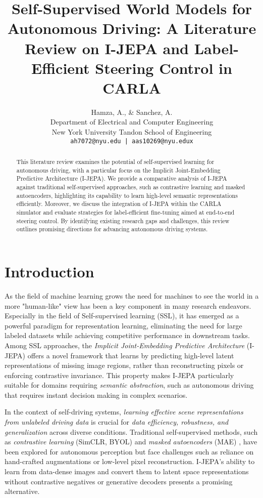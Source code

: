 \documentclass{article}
\title{Self-Supervised World Models for Autonomous Driving: A Literature Review on I-JEPA and Label-Efficient Steering Control in CARLA}
\author{
    Hamza, A., \& Sanchez, A. \\
    Department of Electrical and Computer Engineering \\
    New York University Tandon School of Engineering \\
    \texttt{ah7072@nyu.edu | aas10269@nyu.edux}
}
\begin{document}
\maketitle

\begin{abstract}
    This literature review examines the potential of self-supervised learning for autonomous driving, with a particular focus on the Implicit Joint-Embedding Predictive Architecture (I-JEPA). We provide a comparative analysis of I-JEPA against traditional self-supervised approaches, such as contrastive learning and masked autoencoders, highlighting its capability to learn high-level semantic representations efficiently. Moreover, we discuss the integration of I-JEPA within the CARLA simulator and evaluate strategies for label-efficient fine-tuning aimed at end-to-end steering control. By identifying existing research gaps and challenges, this review outlines promising directions for advancing autonomous driving systems.
\end{abstract}

\section{Introduction}

As the field of machine learning grows the need for machines to see the world in a more "human-like" view has been a key component in many research endeavors. Especially in the field of Self-supervised learning (SSL), it has emerged as a powerful paradigm for representation learning, eliminating the need for large labeled datasets while achieving competitive performance in downstream tasks. Among SSL approaches, the \textit{Implicit Joint-Embedding Predictive Architecture} (I-JEPA) \citep{assran2023self} offers a novel framework that learns by predicting high-level latent representations of missing image regions, rather than reconstructing pixels or enforcing contrastive invariance. This property makes I-JEPA particularly suitable for domains requiring \textit{semantic abstraction}, such as autonomous driving that requires instant decision making in complex scenarios.

In the context of self-driving systems, \textit{learning effective scene representations from unlabeled driving data} is crucial for \textit{data efficiency, robustness, and generalization} across diverse conditions. Traditional self-supervised methods, such as \textit{contrastive learning} (SimCLR, BYOL) \citep{chen2020simple, grill2020bootstrap} and \textit{masked autoencoders} (MAE) \citep{he2021masked}, have been explored for autonomous perception but face challenges such as reliance on hand-crafted augmentations or low-level pixel reconstruction. I-JEPA's ability to learn from data-dense images and convert them to latent space representations without contrastive negatives or generative decoders presents a promising alternative.
\end{document}
